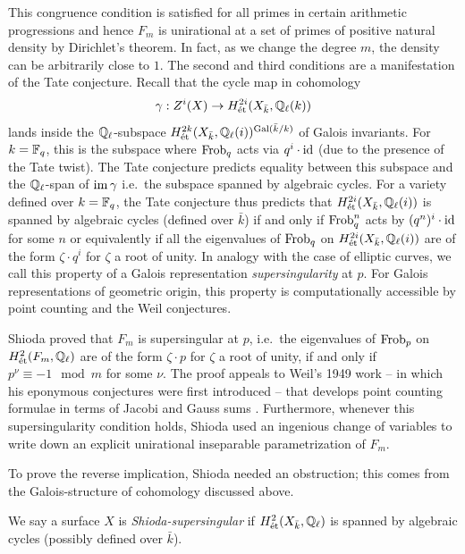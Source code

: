 \documentclass[main.tex]{subfiles}
\begin{document}
This congruence condition is satisfied for all primes in certain arithmetic progressions and hence $F_m$ is unirational at a set of primes of positive natural density by Dirichlet's theorem. In fact, as we change the degree $m$, the density can be arbitrarily close to $1$. The second and third conditions are a manifestation of the Tate conjecture. Recall that the cycle map in \etale cohomology
\[ \gamma : Z^i(X) \to H^{2i}_{\mathrm{\acute{e}t}}(X_{\bar{k}}, \mathbb{Q}_{\ell}(k)) \]
lands inside the $\mathbb{Q}_{\ell}$-subspace $H^{2k}_{\mathrm{\acute{e}t}}(X_{\bar{k}}, \mathbb{Q}_{\ell}(i))^{\operatorname{\mathrm{Gal}}(\bar{k}/k)}$ of Galois invariants. For $k = \mathbb{F}_q$, this is the subspace where $\operatorname{\mathrm{Frob}}_q$ acts via $q^i \cdot \mathrm{id}$ (due to the presence of the Tate twist). The Tate conjecture predicts equality between this subspace and the $\mathbb{Q}_{\ell}$-span of $\operatorname{\mathrm{im}}{\gamma}$ i.e.\ the subspace spanned by algebraic cycles. For a variety defined over $k = \mathbb{F}_q$, the Tate conjecture thus predicts that $H^{2i}_{\mathrm{\acute{e}t}}(X_{\bar{k}}, \mathbb{Q}_{\ell}(i))$ is spanned by algebraic cycles (defined over $\bar{k}$) if and only if $\operatorname{\mathrm{Frob}}_q^n$ acts by $(q^n)^i \cdot \mathrm{id}$ for some $n$ or equivalently if all the eigenvalues of $\operatorname{\mathrm{Frob}}_q$ on $H^{2i}_{\mathrm{\acute{e}t}}(X_{\bar{k}}, \mathbb{Q}_{\ell}(i))$ are of the form $\zeta \cdot q^i$ for $\zeta$ a root of unity. In analogy with the case of elliptic curves, we call this property of a Galois representation \textit{supersingularity} at $p$. For Galois representations of geometric origin, this property is computationally accessible by point counting and the Weil conjectures.
\par 
Shioda proved that $F_m$ is supersingular at $p$, i.e.\ the eigenvalues of $\operatorname{\mathrm{Frob}}_p$ on $H^2_{\mathrm{\acute{e}t}}(F_m, \mathbb{Q}_{\ell})$ are of the form $\zeta \cdot p$ for $\zeta$ a root of unity, if and only if $p^\nu \equiv -1 \mod m$ for some $\nu$. The proof appeals to Weil's 1949 work -- in which his eponymous conjectures were first introduced -- that develops point counting formulae in terms of Jacobi and Gauss sums \cite{weil:counting_1949}. Furthermore, whenever this supersingularity condition holds, Shioda used an ingenious change of variables to write down an explicit unirational inseparable parametrization of $F_m$.
\par 
To prove the reverse implication, Shioda needed an obstruction; this comes from the Galois-structure of \etale cohomology discussed above.

\begin{defn}
We say a surface $X$ is \textit{Shioda-supersingular} if $H^2_{\mathrm{\acute{e}t}}(X_{\bar{k}}, \mathbb{Q}_{\ell})$ is spanned by algebraic cycles (possibly defined over $\bar{k}$).
\end{defn}
\end{document}
